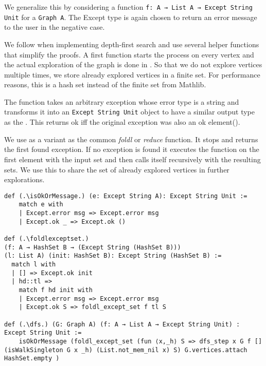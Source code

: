 We generalize this by considering a function \lstinline|f: A → List A → Except String Unit| for a \lstinline|Graph A|. The Except type is again chosen to return an error message to the user in the negative case.

We follow \cite{AlgorithmsBook} when implementing depth-first search and use several helper functions that simplify the proofs. A first function \dfs starts the process on every vertex and the actual exploration of the graph is done in \dfsstep. So that we do not explore vertices multiple times, we store already explored vertices in a finite set. For performance reasons, this is a hash set instead of the finite set from Mathlib.

The function \isOkOrMessage takes an arbitrary exception whose error type is a string and transforms it into an \lstinline|Except String Unit| object to have a similar output type as the \treeValidator. This returns ok iff the original exception was also an ok element(\isOkOrMessageOkIffExceptionIsOk).

We use \foldlexceptset as a variant as the common \textit{foldl} or \textit{reduce} function. It stops and returns the first found exception. If no exception is found it executes the function on the first element with the input set and then calls itself recursively with the resulting sets. We use this to share the set of already explored vertices in further explorations.

\begin{lstlisting}
def (.\isOkOrMessage.) (e: Except String A): Except String Unit :=
    match e with
    | Except.error msg => Except.error msg
    | Except.ok _ => Except.ok ()

def (.\foldlexceptset.) 
(f: A → HashSet B → (Except String (HashSet B))) 
(l: List A) (init: HashSet B): Except String (HashSet B) :=
  match l with
  | [] => Except.ok init
  | hd::tl =>
    match f hd init with
    | Except.error msg => Except.error msg
    | Except.ok S => foldl_except_set f tl S

def (.\dfs.) (G: Graph A) (f: A → List A → Except String Unit) : Except String Unit :=
    isOkOrMessage (foldl_except_set (fun ⟨x,_h⟩ S => dfs_step x G f [] (isWalkSingleton G x _h) (List.not_mem_nil x) S) G.vertices.attach HashSet.empty )
\end{lstlisting}

